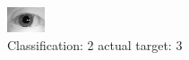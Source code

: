 \begin{figure}[h!]
\begin{center}
\includegraphics[width=0.60\columnwidth]{figures/ID1037_class_2_target_3.png}
\end{center}
\caption{ Classification: 2 actual target: 3}
\label{fig:ID1037_class_2_target_3}
\end{figure}
